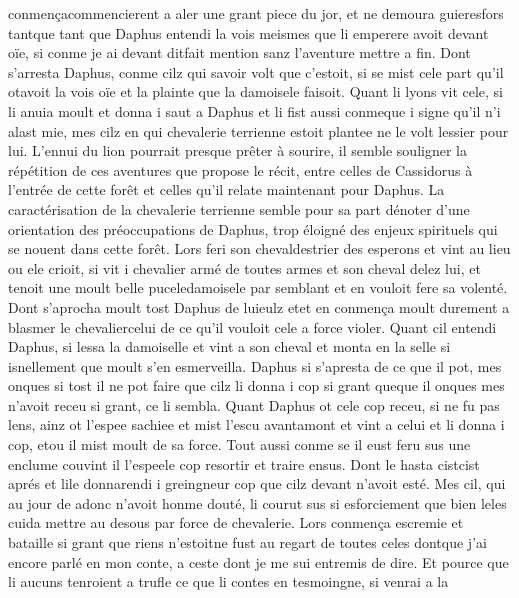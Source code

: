 \documentclass{article}
\begin{document}
\begin{pages}
   conmençacommencierent a aler une grant piece du jor, et ne demoura 
   guieresfors tantque tant que 
   Daphus entendi la vois meismes que li emperere avoit 
   devant oïe, si conme je ai devant 
      ditfait mention sanz l’aventure mettre a fin. 
   Dont s’arresta Daphus, conme cilz qui savoir volt que c’estoit, 
   si se mist cele part qu’il otavoit la vois oïe et la plainte que 
   la damoisele faisoit.
   Quant li lyons vit cele, 
   si li anuia moult et donna i saut a Daphus et li fist aussi 
   conmeque i signe 
   qu’il n’i alast mie, mes cilz en qui chevalerie terrienne estoit plantee ne le volt lessier pour lui.
   L'ennui du lion pourrait presque prêter à sourire, il semble souligner la répétition de ces aventures que 
   propose le récit, entre celles de Cassidorus à l'entrée de cette forêt et celles qu'il relate maintenant pour Daphus.
   La caractérisation de la chevalerie terrienne semble pour sa part dénoter d'une orientation des préoccupations de Daphus,
   trop éloigné des enjeux spirituels qui se nouent dans cette forêt.
   Lors feri son chevaldestrier des esperons et vint au lieu ou ele crioit, 
   si vit i chevalier armé de toutes armes et 
   son cheval delez lui, et tenoit une 
   moult belle puceledamoisele 
   par semblant et en vouloit fere sa volenté. Dont s’aprocha moult tost Daphus 
   de luieulz 
   etet en conmença moult 
   durement a blasmer 
   le chevaliercelui de ce 
   qu’il vouloit cele a force violer. Quant cil entendi Daphus, si lessa 
   la damoiselle et vint a son cheval et monta en la selle 
   si isnellement que moult s’en esmerveilla. Daphus si s’apresta de ce que il pot, 
   mes onques si tost il ne pot faire que cilz li donna i cop si grant 
   queque il onques mes n’avoit receu si grant, ce li sembla. \pend
\pstart Quant Daphus ot 
   cele cop receu, si ne fu pas lens, ainz ot l’espee sachiee et mist l’escu 
   avantamont et vint a celui et li donna i cop, 
   etou il mist moult de sa force. Tout aussi conme se il eust feru sus une 
   enclume couvint il 
   l’espeele cop resortir et traire ensus. 
   Dont le hasta cistcist aprés et 
   lile 
   donnarendi i greingneur cop que 
   cilz 
   devant n’avoit esté. Mes cil, qui au jour de adonc n’avoit honme douté, 
   li courut sus si esforciement que bien leles cuida mettre au desous par force de 
   chevalerie. Lors conmença escremie et bataille si grant que riens n’estoitne fust 
   au regart de toutes celes dontque j’ai encore parlé en mon conte,
      a ceste dont je me sui entremis de dire. Et pource que li aucuns tenroient a trufle ce que li contes en tesmoingne, si venrai a la 

\end{pages}
\end{document}
